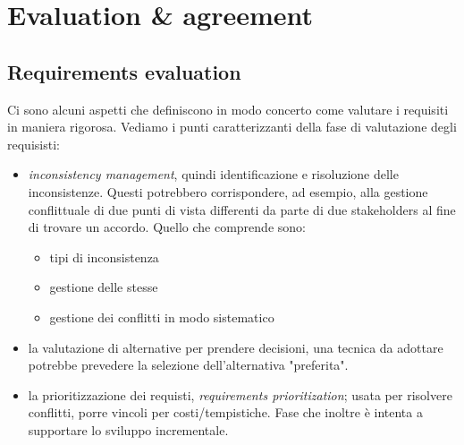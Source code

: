 \section{Evaluation \& agreement}
\subsection{Requirements evaluation}
Ci sono alcuni aspetti che definiscono in modo concerto come valutare i requisiti in maniera rigorosa. Vediamo i punti caratterizzanti della fase di valutazione degli requisisti:
\begin{itemize}
  \item \textit{inconsistency management}, quindi identificazione e risoluzione delle inconsistenze. Questi potrebbero corrispondere, ad esempio, alla gestione conflittuale di due punti di vista differenti da parte di due stakeholders al fine di trovare un accordo. Quello che comprende sono:
  \begin{itemize}
    \item tipi di inconsistenza
    \item gestione delle stesse 
    \item gestione dei conflitti in modo sistematico
  \end{itemize}
  \item la valutazione di alternative per prendere decisioni, una tecnica da adottare potrebbe prevedere la selezione dell'alternativa "preferita".
  \item la prioritizzazione dei requisti, \textit{requirements prioritization}; usata per risolvere conflitti, porre vincoli per costi/tempistiche. Fase che inoltre è intenta a supportare lo sviluppo incrementale.
\end{itemize}

